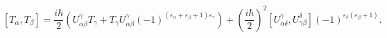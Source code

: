 \begin{equation}\label{5.2}
[T_\alpha,T_\beta]=\frac{i\hbar}{2}\left(U^\gamma_{\alpha\beta}T_\gamma+
T_\gamma U^\gamma_{\alpha\beta}
(-1)^{(\varepsilon_\alpha+\varepsilon_\beta+1)\varepsilon_\gamma}\right)+
\left(\frac{i\hbar}{2}\right)^2
[U^\gamma_{\alpha\delta},U^\delta_{\gamma\beta}]
(-1)^{\varepsilon_\delta(\varepsilon_\beta+1)}.
\end{equation}

